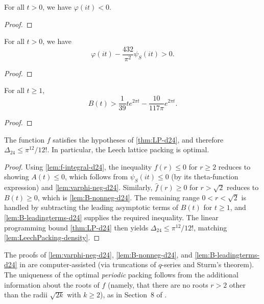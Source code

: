 \begin{lemma}\label{lem:varphi-neg-d24}\leanok
  For all $t>0$, we have $\varphi(it)<0$.
\end{lemma}
\begin{proof}\leanok
\end{proof}

\begin{lemma}\label{lem:B-nonneg-d24}\leanok
  For all $t>0$, we have
  \[
    \varphi(it)-\frac{432}{\pi^2}\psi_S(it)>0.
  \]
\end{lemma}
\begin{proof}\leanok
\end{proof}

\begin{lemma}\label{lem:B-leadingterms-d24}\leanok
  For all $t\ge 1$,
  \[
    B(t)>\frac{1}{39}t e^{2\pi t}-\frac{10}{117\pi}e^{2\pi t}.
  \]
\end{lemma}
\begin{proof}\leanok
\end{proof}

\begin{theorem}\label{thm:magic-function-d24}\leanok
  The function $f$ satisfies the hypotheses of \cref{thm:LP-d24}, and therefore $\Delta_{24}\le \pi^{12}/12!$.
  In particular, the Leech lattice packing is optimal.
\end{theorem}
\begin{proof}\leanok
  Using \cref{lem:f-integral-d24}, the inequality $f(r)\le 0$ for $r\ge 2$ reduces to showing $A(t)\le 0$, which follows from $\psi_S(it)\le 0$ (by its theta-function expression) and \cref{lem:varphi-neg-d24}.
  Similarly, $\widehat f(r)\ge 0$ for $r>\sqrt2$ reduces to $B(t)\ge 0$, which is \cref{lem:B-nonneg-d24}.
  The remaining range $0<r<\sqrt2$ is handled by subtracting the leading asymptotic terms of $B(t)$ for $t\ge 1$, and \cref{lem:B-leadingterms-d24} supplies the required inequality.
  The linear programming bound \cref{thm:LP-d24} then yields $\Delta_{24}\le \pi^{12}/12!$, matching \cref{lem:LeechPacking-density}.
\end{proof}

\begin{remark}
  The proofs of \cref{lem:varphi-neg-d24}, \cref{lem:B-nonneg-d24}, and \cref{lem:B-leadingterms-d24} in \cite{CKMRV24} are computer-assisted (via truncations of $q$-series and Sturm's theorem).
  The uniqueness of the optimal \emph{periodic} packing follows from the additional information about the roots of $f$ (namely, that there are no roots $r>2$ other than the radii $\sqrt{2k}$ with $k\ge 2$), as in Section~8 of \cite{ElkiesCohn}.
\end{remark}
